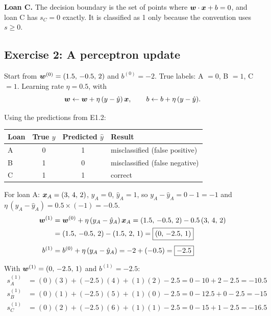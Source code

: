 \textbf{Loan C.} The decision boundary is the set of points where $\bm{w}\cdot\bm{x}+b = 0$,
and loan C has $s_C = 0$ exactly. It is classified as 1 only because the convention uses
$s \geq 0$.

\subsection{Exercise 2: A perceptron update}
Start from $\bm{w}^{(0)} = (1.5,\,-0.5,\,2)$ and $b^{(0)} = -2$. True labels: A $=0$, B $=1$, C $=1$. Learning rate $\eta = 0.5$, with
\[
  \bm{w} \leftarrow \bm{w} + \eta\,(y-\hat y)\,\bm{x}, \qquad b \leftarrow b + \eta\,(y-\hat y).
\]

Using the predictions from E1.2:

\begin{table}[H]\centering\small
\begin{tabular}{lccl}\toprule
Loan & True $y$ & Predicted $\hat y$ & Result\\\midrule
A & 0 & 1 & misclassified (false positive)\\
B & 1 & 0 & misclassified (false negative)\\
C & 1 & 1 & correct\\\bottomrule
\end{tabular}\end{table}


For loan A: $\bm{x}_A = (3,\,4,\,2)$, $y_A = 0$, $\hat y_A = 1$, so $y_A - \hat y_A = 0 - 1 = -1$ and
$\eta\,(y_A - \hat y_A) = 0.5 \times (-1) = -0.5$.
\begin{align*}
\bm{w}^{(1)} &= \bm{w}^{(0)} + \eta\,(y_A-\hat y_A)\,\bm{x}_A
               = (1.5,\,-0.5,\,2) - 0.5\,(3,\,4,\,2)\\
               &= (1.5,\,-0.5,\,2) - (1.5,\,2,\,1) = \boxed{(0,\,-2.5,\,1)}\\[4pt]
b^{(1)} &= b^{(0)} + \eta\,(y_A-\hat y_A) = -2 + (-0.5) = \boxed{-2.5}
\end{align*}

With $\bm{w}^{(1)} = (0,\,-2.5,\,1)$ and $b^{(1)} = -2.5$:
\begin{align*}
s_A^{(1)} &= (0)(3) + (-2.5)(4) + (1)(2) - 2.5 = 0 - 10 + 2 - 2.5 = -10.5\\
s_B^{(1)} &= (0)(1) + (-2.5)(5) + (1)(0) - 2.5 = 0 - 12.5 + 0 - 2.5 = -15\\
s_C^{(1)} &= (0)(2) + (-2.5)(6) + (1)(1) - 2.5 = 0 - 15 + 1 - 2.5 = -16.5
\end{align*}


